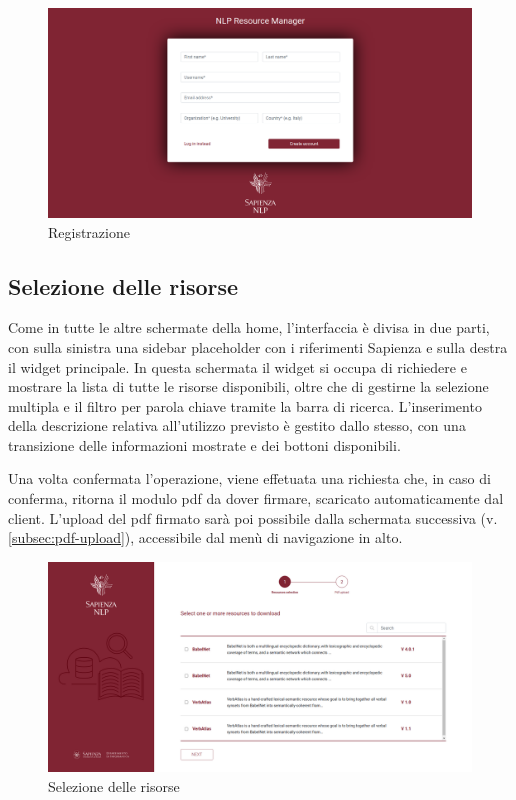 \begin{figure}[H]
	\centering
	\includegraphics[width=\textwidth]{assets/ui/signup.png}
	\caption{Registrazione}
	\label{fig:signup}
\end{figure}


\subsection{Selezione delle risorse} \label{subsec:resources-selection}
Come in tutte le altre schermate della home, l'interfaccia è divisa in due parti,
con sulla sinistra una sidebar placeholder con i riferimenti Sapienza e sulla
destra il widget principale. In questa schermata il widget si occupa di richiedere
e mostrare la lista di tutte le risorse disponibili, oltre che di gestirne la
selezione multipla e il filtro per parola chiave tramite la barra di ricerca.
L'inserimento della descrizione relativa all'utilizzo previsto è gestito dallo
stesso, con una transizione delle informazioni mostrate e dei bottoni disponibili.

Una volta confermata l'operazione, viene effetuata una richiesta che, in caso di
conferma, ritorna il modulo pdf da dover firmare, scaricato automaticamente dal
client. L'upload del pdf firmato sarà poi possibile dalla schermata successiva
(v. \autoref{subsec:pdf-upload}), accessibile dal menù di navigazione in alto.

\begin{figure}[H]
	\centering
	\includegraphics[width=\textwidth]{assets/ui/resources-selection.png}
	\caption{Selezione delle risorse}
	\label{fig:resources-selection}
\end{figure}

